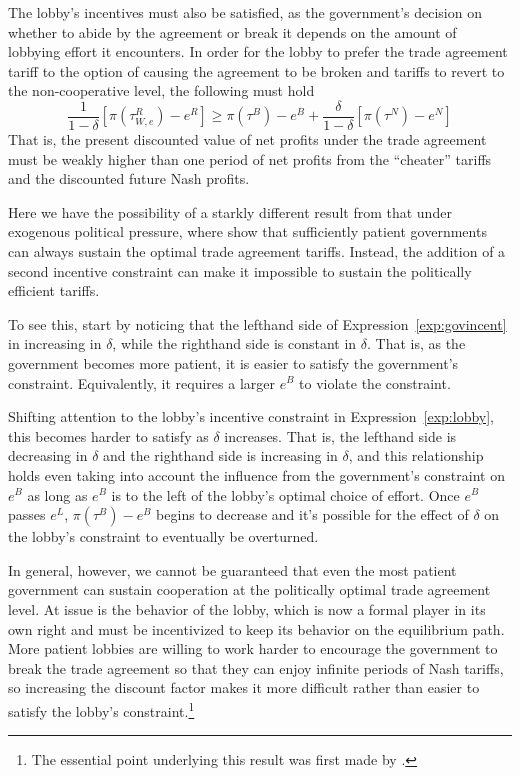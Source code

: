 \documentclass[12pt]{article}
\newcommand{\de}{\delta}
\begin{document}
The lobby's incentives must also be satisfied, as the government's decision on whether to abide by the agreement or break it depends on the amount of lobbying effort it encounters. In order for the lobby to prefer the trade agreement tariff to the option of causing the agreement to be broken and tariffs to revert to the non-cooperative level, the following must hold
\begin{equation}
  \frac{1}{1-\de}\left[\pi(\tau^R_{W,e}) - e^R\right] \geq \pi(\tau^B) - e^B + \frac{\de}{1-\de}\left[\pi(\tau^N) - e^N\right]
	\label{exp:lobby}
\end{equation}
That is, the present discounted value of net profits under the trade agreement must be weakly higher than one period of net profits from the ``cheater'' tariffs and the discounted future Nash profits.

Here we have the possibility of a starkly different result from that under exogenous political pressure, where \Textcite{bs2005} show that sufficiently patient governments can always sustain the optimal trade agreement tariffs. Instead, the addition of a second incentive constraint can make it impossible to sustain the politically efficient tariffs.

To see this, start by noticing that the lefthand side of Expression~\ref{exp:govincent} in increasing in $\de$, while the righthand side is constant in $\de$. That is, as the government becomes more patient, it is easier to satisfy the government's constraint. Equivalently, it requires a larger $e^B$ to violate the constraint.

Shifting attention to the lobby's incentive constraint in Expression~\ref{exp:lobby}, this becomes harder to satisfy as $\de$ increases. That is, the lefthand side is decreasing in $\de$ and the righthand side is increasing in $\de$, and this relationship holds even taking into account the influence from the government's constraint on $e^B$ as long as $e^B$ is to the left of the lobby's optimal choice of effort. Once $e^B$ passes $e^L$, $\pi(\tau^B) - e^B$ begins to decrease and it's possible for the effect of $\de$ on the lobby's constraint to eventually be overturned.

In general, however, we cannot be guaranteed that even the most patient government can sustain cooperation at the politically optimal trade agreement level. At issue is the behavior of the lobby, which is now a formal player in its own right and must be incentivized to keep its behavior on the equilibrium path. More patient lobbies are willing to work harder to encourage the government to break the trade agreement so that they can enjoy infinite periods of Nash tariffs, so increasing the discount factor makes it more difficult rather than easier to satisfy the lobby's constraint.\footnote{The essential point underlying this result was first made by \Textcite{buzard2013a}.}
\end{document}
